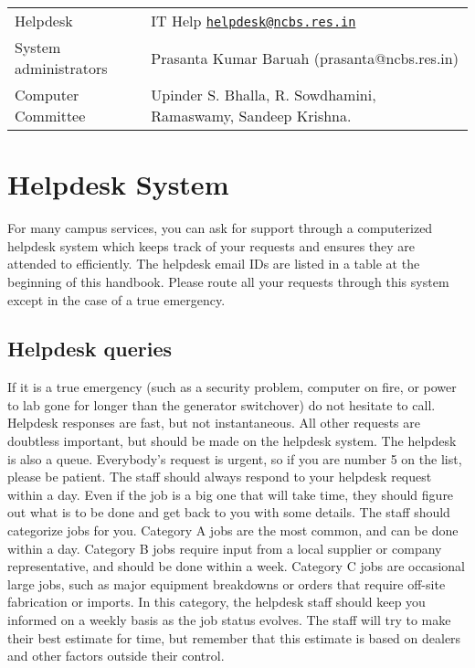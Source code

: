 \documentclass[a4paper]{extarticle}
\newcommand\MAILTO[2]{#1 \Letter\; \href{mailto:#2}{\nolinkurl{#2}}}
\begin{document}
\begin{tabular}{l l}
    Helpdesk & \MAILTO{IT Help}{helpdesk@ncbs.res.in} \\
    System administrators & Prasanta Kumar Baruah (prasanta@ncbs.res.in) \\
    Computer Committee & Upinder S. Bhalla, R. Sowdhamini, Ramaswamy, Sandeep Krishna.
\end{tabular} 

\section{Helpdesk System}

For many campus services, you can ask for support through a computerized helpdesk system
which keeps track of your requests and ensures they are attended to efficiently. The
helpdesk email IDs are listed in a table at the beginning of this handbook. Please route all
your requests through this system except in the case of a true emergency.

\subsection{Helpdesk queries}
If it is a true emergency (such as a security problem, computer on fire, or
power to lab gone for longer than the generator switchover) do not hesitate to call. Helpdesk
responses are fast, but not instantaneous. All other requests are doubtless important, but
should be made on the helpdesk system.
The helpdesk is also a queue. Everybody's request is urgent, so if you are number 5 on the
list, please be patient.
The staff should always respond to your helpdesk request within a day. Even if the job is a
big one that will take time, they should figure out what is to be done and get back to you
with some details.
The staff should categorize jobs for you. Category A jobs are the most common, and can be
done within a day. Category B jobs require input from a local supplier or company
representative, and should be done within a week. Category C jobs are occasional large jobs,
such as major equipment breakdowns or orders that require off-site fabrication or imports. In
this category, the helpdesk staff should keep you informed on a weekly basis as the job
status evolves. The staff will try to make their best estimate for time, but remember that this
estimate is based on dealers and other factors outside their control.
\end{document}
